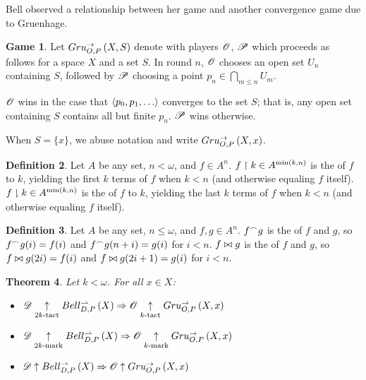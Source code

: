 \documentclass{amsart}
\newtheorem{theorem}{Theorem}[section]
\theoremstyle{definition}
\newtheorem{definition}[theorem]{Definition}
\newtheorem{game}[theorem]{Game}
\begin{document}
  Bell observed a relationship between her game and another convergence
  game due to Gruenhage.

  \begin{game}
    Let \(Gru_{O,P}^{\to}\left({X},{S}\right)\) denote
     with
    players \(\mathscr{O}\), \(\mathscr{P}\) which proceeds as follows for a space
    \(X\) and a set \(S\). In round \(n\),
    \(\mathscr{O}\) chooses an open set \(U_n\) containing
    \(S\), followed by \(\mathscr{P}\)
    choosing a point \(p_n\in \bigcap_{m\leq n}U_m\).

    \(\mathscr{O}\) wins in the case that
    \(\<p_0,p_1,\dots\>\) converges to the set \(S\); that is,
    any open set containing \(S\) contains all but finite \(p_n\).
    \(\mathscr{P}\) wins otherwise.
  \end{game}

  When \(S=\{x\}\), we abuse notation and write
  \(Gru_{O,P}^{\to}\left({X},{x}\right)\).

  \begin{definition}
    Let \(A\) be any set, \(n<\omega\), and \(f\in A^n\).
    \(f\restriction k\in A^{\min(k,n)}\) is the  of \(f\)
    to \(k\), yielding the first \(k\) terms of
    \(f\) when \(k<n\) (and otherwise equaling \(f\) itself).
    \(f\downharpoonright k\in A^{\min(k,n)}\) is the  of \(f\)
    to \(k\), yielding the last \(k\) terms of
    \(f\) when \(k<n\) (and otherwise equaling \(f\) itself).
  \end{definition}

  \begin{definition}
    Let \(A\) be any set, \(n\leq\omega\), and \(f,g\in A^{n}\).
    \(f{^\frown} g\) is the  of \(f\) and \(g\), so
    \(f{^\frown} g(i)=f(i)\) and \(f{^\frown} g(n+i)=g(i)\) for \(i<n\).
    \(f\bowtie g\) is the  of \(f\) and \(g\), so
    \(f\bowtie g(2i)=f(i)\) and \(f\bowtie g(2i+1)=g(i)\) for \(i<n\).
  \end{definition}

  \begin{theorem}
    Let \(k<\omega\). For all \(x\in X\):
    \begin{itemize}
      \item
        \(
          \mathscr{D}\underset{2k\text{-tact}}{\uparrow} Bell_{D,P}^{\rightharpoonup}\left({X}\right)
            \Rightarrow
          \mathscr{O} \underset{k\text{-tact}}{\uparrow} Gru_{O,P}^{\to}\left({X},{x}\right)
        \)
      \item
        \(
          \mathscr{D}\underset{2k\text{-mark}}{\uparrow} Bell_{D,P}^{\rightharpoonup}\left({X}\right)
            \Rightarrow
          \mathscr{O} \underset{k\text{-mark}}{\uparrow} Gru_{O,P}^{\to}\left({X},{x}\right)
        \)
      \item
        \(
          \mathscr{D}\uparrow Bell_{D,P}^{\rightharpoonup}\left({X}\right)
            \Rightarrow
          \mathscr{O} \uparrow Gru_{O,P}^{\to}\left({X},{x}\right)
        \)
    \end{itemize}
  \end{theorem}
\end{document}
